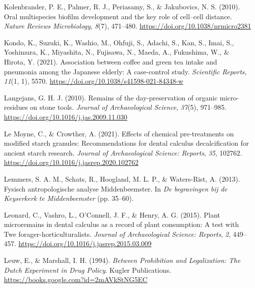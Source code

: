 \documentclass[
  letterpaper,
]{book}
\newlength{\cslhangindent}
\newlength{\cslentryspacingunit} %
\newenvironment{CSLReferences}[2] %
 {%
  \setlength{\parindent}{0pt}
  \ifodd #1
  \let\oldpar\par
  \def\par{\hangindent=\cslhangindent\oldpar}
  \fi
  \setlength{\parskip}{#2\cslentryspacingunit}
 }%
 {}
\begin{document}
\begin{CSLReferences}{1}{0}
\leavevmode{}%
Kolenbrander, P. E., Palmer, R. J., Periasamy, S., \& Jakubovics, N. S.
(2010). Oral multispecies biofilm development and the key role of
cell--cell distance. \emph{Nature Reviews Microbiology}, \emph{8}(7),
471--480. \url{https://doi.org/10.1038/nrmicro2381}

\leavevmode{}%
Kondo, K., Suzuki, K., Washio, M., Ohfuji, S., Adachi, S., Kan, S.,
Imai, S., Yoshimura, K., Miyashita, N., Fujisawa, N., Maeda, A.,
Fukushima, W., \& Hirota, Y. (2021). Association between coffee and
green tea intake and pneumonia among the {Japanese} elderly: A
case-control study. \emph{Scientific Reports}, \emph{11}(1, 1), 5570.
\url{https://doi.org/10.1038/s41598-021-84348-w}

\leavevmode{}%
Langejans, G. H. J. (2010). Remains of the day-preservation of organic
micro-residues on stone tools. \emph{Journal of Archaeological Science},
\emph{37}(5), 971--985. \url{https://doi.org/10.1016/j.jas.2009.11.030}

\leavevmode{}%
Le Moyne, C., \& Crowther, A. (2021). Effects of chemical pre-treatments
on modified starch granules: {Recommendations} for dental calculus
decalcification for ancient starch research. \emph{Journal of
Archaeological Science: Reports}, \emph{35}, 102762.
\url{https://doi.org/10.1016/j.jasrep.2020.102762}

\leavevmode{}%
Lemmers, S. A. M., Schats, R., Hoogland, M. L. P., \& Waters-Rist, A.
(2013). Fysisch antropologische analyse Middenbeemster. In \emph{De
begravingen bij de Keyserkerk te Middenbeemster} (pp. 35--60).

\leavevmode{}%
Leonard, C., Vashro, L., O'Connell, J. F., \& Henry, A. G. (2015). Plant
microremains in dental calculus as a record of plant consumption: {A}
test with {Twe} forager-horticulturalists. \emph{Journal of
Archaeological Science: Reports}, \emph{2}, 449--457.
\url{https://doi.org/10.1016/j.jasrep.2015.03.009}

\leavevmode{}%
Leuw, E., \& Marshall, I. H. (1994). \emph{Between {Prohibition} and
{Legalization}: {The Dutch Experiment} in {Drug Policy}}. {Kugler
Publications}. \url{https://books.google.com?id=2mAVkStNG5EC}


\end{CSLReferences}
\end{document}
